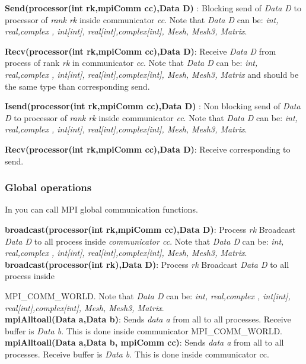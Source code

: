 \documentclass[a4paper,twoside,12pt]{book}
\begin{document}
\textbf{Send(processor(int rk,mpiComm cc),Data D)} : Blocking send of
\textit{Data D} to processor of \textit{rank rk} inside communicator
\textit{cc}. Note that \textit{Data D} can be: \textit{int, real,complex ,
int[int], real[int],complex[int], Mesh, Mesh3, Matrix}.


\textbf{Recv(processor(int rk,mpiComm cc),Data D)}: Receive \textit{Data D} from
process of rank \textit{rk} in communicator \textit{cc}. Note that \textit{Data
D} can be: \textit{int, real,complex , int[int], real[int],complex[int], Mesh,
Mesh3, Matrix} and should be the same type than corresponding send.


\textbf{Isend(processor(int rk,mpiComm cc),Data D)} : Non blocking send of
\textit{Data D} to processor of \textit{rank rk} inside communicator
\textit{cc}. Note that \textit{Data D} can be: \textit{int, real,complex ,
int[int], real[int],complex[int], Mesh, Mesh3, Matrix}.

\textbf{Recv(processor(int rk,mpiComm cc),Data D)}: Receive corresponding to
send.

\subsubsection{Global operations}

In \freefempp you can call MPI global communication functions.

\textbf{broadcast(processor(int rk,mpiComm cc),Data D)}: Process \textit{rk}
Broadcast \textit{Data D} to all process inside \textit{communicator cc}. Note
that \textit{Data D} can be: \textit{int, real,complex , int[int],
real[int],complex[int], Mesh, Mesh3, Matrix}.\\


\textbf{broadcast(processor(int rk),Data D)}: Process \textit{rk} Broadcast
\textit{Data D} to all process inside

MPI\_COMM\_WORLD. Note that \textit{Data D} can be: \textit{int, real,complex ,
int[int], real[int],complex[int], Mesh, Mesh3, Matrix}.\\


\textbf{mpiAlltoall(Data a,Data b)}: Sends \textit{data a} from all to all
processes. Receive buffer is \textit{Data b}. This is done inside communicator
MPI\_COMM\_WORLD.\\


\textbf{mpiAlltoall(Data a,Data b, mpiComm cc)}: Sends \textit{data a} from all
to all processes. Receive buffer is \textit{Data b}. This is done inside
communicator cc.\\
\end{document}
